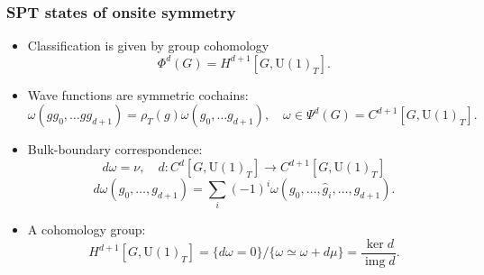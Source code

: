 \documentclass[xcolor=table, 10pt, aspectratio=43]{beamer}
\newcommand{\uone}{\mathrm U(1)}
\DeclareMathOperator{\img}{img}
\begin{document}
\begin{frame}
  \frametitle{SPT states of onsite symmetry}
  \begin{itemize}
    \item Classification is given by group cohomology
    \[\Phi^d(G) = H^{d+1}[G, \uone_T].\]
		\item Wave functions are symmetric cochains:
		\[\omega(gg_0,\ldots gg_{d+1})=\rho_T(g)\omega(g_0,\ldots g_{d+1}),\quad
		\omega\in\Psi^d(G) = C^{d+1}[G, \uone_T].\]
		\item Bulk-boundary correspondence:
		\[d\omega = \nu,\quad d:C^d[G, \uone_T]\rightarrow C^{d+1}[G, \uone_T]\]
		\[d\omega(g_0,\ldots,g_{d+1})
		=\sum_i(-1)^i\omega(g_0,\ldots,\hat g_i,\ldots,g_{d+1}).\]
\begin{center}
\end{center}
  \item A cohomology group:
\[H^{d+1}[G,\uone_T]=\{d\omega=0\}/\{\omega\simeq\omega+d\mu\}=\frac{\ker d}{\img d}.\]
  \end{itemize}
\end{frame}
\end{document}
